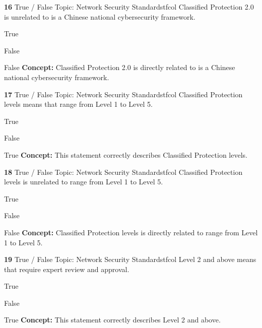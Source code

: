 \documentclass[10pt,a4paper]{article}
\begin{document}
\begin{qcard}{\color{white}\textbf{16} \hfill \small True / False \textbar{} Topic: Network Security Standards}{tfcol}
Classified Protection 2.0 is unrelated to is a Chinese national cybersecurity framework.

\begin{qoptions}
\item True
\item False
\end{qoptions}
\begin{explainbox}{False}
\textbf{Concept:} Classified Protection 2.0 is directly related to is a Chinese national cybersecurity framework.
\end{explainbox}
\end{qcard}

\begin{qcard}{\color{white}\textbf{17} \hfill \small True / False \textbar{} Topic: Network Security Standards}{tfcol}
Classified Protection levels means that range from Level 1 to Level 5.

\begin{qoptions}
\item True
\item False
\end{qoptions}
\begin{explainbox}{True}
\textbf{Concept:} This statement correctly describes Classified Protection levels.
\end{explainbox}
\end{qcard}

\begin{qcard}{\color{white}\textbf{18} \hfill \small True / False \textbar{} Topic: Network Security Standards}{tfcol}
Classified Protection levels is unrelated to range from Level 1 to Level 5.

\begin{qoptions}
\item True
\item False
\end{qoptions}
\begin{explainbox}{False}
\textbf{Concept:} Classified Protection levels is directly related to range from Level 1 to Level 5.
\end{explainbox}
\end{qcard}

\begin{qcard}{\color{white}\textbf{19} \hfill \small True / False \textbar{} Topic: Network Security Standards}{tfcol}
Level 2 and above means that require expert review and approval.

\begin{qoptions}
\item True
\item False
\end{qoptions}
\begin{explainbox}{True}
\textbf{Concept:} This statement correctly describes Level 2 and above.
\end{explainbox}
\end{qcard}
\end{document}

